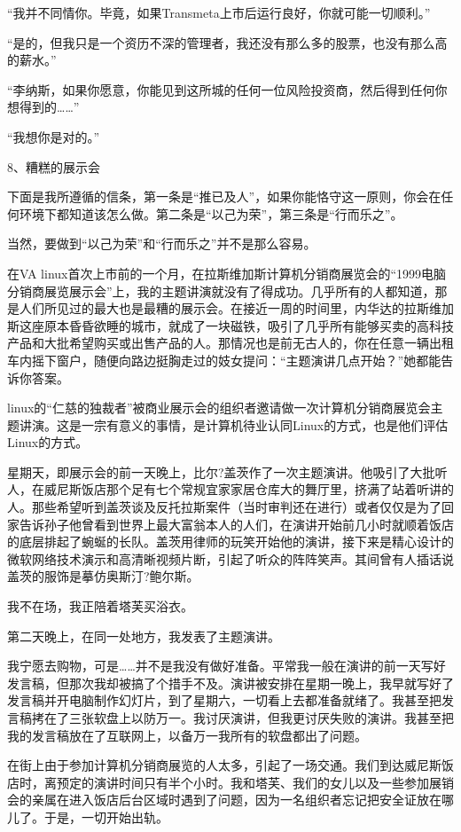 “我并不同情你。毕竟，如果Transmeta上市后运行良好，你就可能一切顺利。”

“是的，但我只是一个资历不深的管理者，我还没有那么多的股票，也没有那么高的薪水。”

“李纳斯，如果你愿意，你能见到这所城的任何一位风险投资商，然后得到任何你想得到的……”

“我想你是对的。”

 
8、糟糕的展示会

下面是我所遵循的信条，第一条是“推已及人”，如果你能恪守这一原则，你会在任何环境下都知道该怎么做。第二条是“以己为荣”，第三条是“行而乐之”。

当然，要做到“以己为荣”和“行而乐之”并不是那么容易。

在VA linux首次上市前的一个月，在拉斯维加斯计算机分销商展览会的“1999电脑分销商展览展示会”上，我的主题讲演就没有了得成功。几乎所有的人都知道，那是人们所见过的最大也是最糟的展示会。在接近一周的时间里，内华达的拉斯维加斯这座原本昏昏欲睡的城市，就成了一块磁铁，吸引了几乎所有能够买卖的高科技产品和大批希望购买或出售产品的人。那情况也是前无古人的，你在任意一辆出租车内摇下窗户，随便向路边挺胸走过的妓女提问：“主题演讲几点开始？”她都能告诉你答案。

linux的“仁慈的独裁者”被商业展示会的组织者邀请做一次计算机分销商展览会主题讲演。这是一宗有意义的事情，是计算机待业认同Linux的方式，也是他们评估Linux的方式。

星期天，即展示会的前一天晚上，比尔?盖茨作了一次主题演讲。他吸引了大批听人，在威尼斯饭店那个足有七个常规宜家家居仓库大的舞厅里，挤满了站着听讲的人。那些希望听到盖茨谈及反托拉斯案件（当时审判还在进行）或者仅仅是为了回家告诉孙子他曾看到世界上最大富翁本人的人们，在演讲开始前几小时就顺着饭店的底层排起了蜿蜒的长队。盖茨用律师的玩笑开始他的演讲，接下来是精心设计的微软网络技术演示和高清晰视频片断，引起了听众的阵阵笑声。其间曾有人插话说盖茨的服饰是摹仿奥斯汀?鲍尔斯。

我不在场，我正陪着塔芙买浴衣。

第二天晚上，在同一处地方，我发表了主题演讲。

我宁愿去购物，可是……并不是我没有做好准备。平常我一般在演讲的前一天写好发言稿，但那次我却被搞了个措手不及。演讲被安排在星期一晚上，我早就写好了发言稿并开电脑制作幻灯片，到了星期六，一切看上去都准备就绪了。我甚至把发言稿拷在了三张软盘上以防万一。我讨厌演讲，但我更讨厌失败的演讲。我甚至把我的发言稿放在了互联网上，以备万一我所有的软盘都出了问题。

在街上由于参加计算机分销商展览的人太多，引起了一场交通。我们到达威尼斯饭店时，离预定的演讲时间只有半个小时。我和塔芙、我们的女儿以及一些参加展销会的亲属在进入饭店后台区域时遇到了问题，因为一名组织者忘记把安全证放在哪儿了。于是，一切开始出轨。

